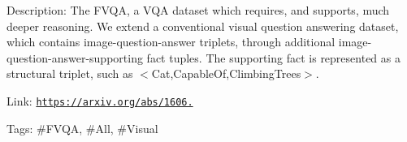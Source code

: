 Description\+: The F\+V\+QA, a V\+QA dataset which requires, and supports, much deeper reasoning. We extend a conventional visual question answering dataset, which contains image-\/question-\/answer triplets, through additional image-\/question-\/answer-\/supporting fact tuples. The supporting fact is represented as a structural triplet, such as $<$Cat,Capable\+Of,Climbing\+Trees$>$.

Link\+: \href{https://arxiv.org/abs/1606.05433}{\tt https\+://arxiv.\+org/abs/1606.}

Tags\+: \#\+F\+V\+QA, \#\+All, \#\+Visual 